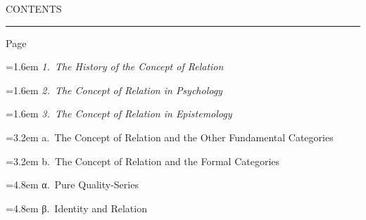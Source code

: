 \documentclass[12pt]{article}
\newcommand{\opage}[1]{\marginnote{\footnotesize\textit{[#1]}}}
\begin{document}
%
%
\clearpage
{\centering\large \opage{109}CONTENTS\par}
\vspace{0.6ex}
{\centering\rule{2.4cm}{0.4pt}\par}
\vspace{1.2ex}
\begingroup
\parindent=0pt
\setlength{\parskip}{0pt}
\small
\mbox{}\hfill Page\par
\hangindent=1.6em \emph{1.~The History of the Concept of Relation}\par
\hangindent=1.6em \emph{2.~The Concept of Relation in Psychology}\par
\hangindent=1.6em \emph{3.~The Concept of Relation in Epistemology}\par
\hangindent=3.2em \hspace*{1.6em}a.~The Concept of Relation and the Other Fundamental Categories\par
\hangindent=3.2em \hspace*{1.6em}b.~The Concept of Relation and the Formal Categories\par
\hangindent=4.8em \hspace*{3.2em}α.~Pure Quality-Series\par
\hangindent=4.8em \hspace*{3.2em}β.~Identity and Relation\par
\end{document}
